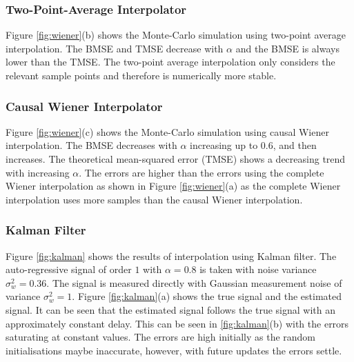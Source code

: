 \documentclass[11pt]{article}
\begin{document}

\subsubsection*{Two-Point-Average Interpolator}
\label{subsubsec:avgimplementation}

Figure \ref{fig:wiener}(b) shows the Monte-Carlo simulation using two-point average interpolation. The BMSE and TMSE decrease with $\alpha$ and the BMSE is always lower than the TMSE. The two-point average interpolation only considers the relevant sample points and therefore is numerically more stable.


\subsubsection*{Causal Wiener Interpolator}
\label{subsubsec:causalimplementation}

Figure \ref{fig:wiener}(c) shows the Monte-Carlo simulation using causal Wiener interpolation. The BMSE decreases with $\alpha$ increasing up to $0.6$, and then increases. The theoretical mean-squared error (TMSE) shows a decreasing trend with increasing $\alpha$. The errors are higher than the errors using the complete Wiener interpolation as shown in Figure \ref{fig:wiener}(a) as the complete Wiener interpolation uses more samples than the causal Wiener interpolation.


\subsubsection*{Kalman Filter}
\label{subsubsec:kalmanimplementation}

Figure \ref{fig:kalman} shows the results of interpolation using Kalman filter. The auto-regressive signal of order $1$ with $\alpha = 0.8$ is taken with noise variance $\sigma_{w}^{2} = 0.36$. The signal is measured directly with Gaussian measurement noise of variance $\sigma_{w}^{2} = 1$. Figure \ref{fig:kalman}(a) shows the true signal and the estimated signal. It can be seen that the estimated signal follows the true signal with an approximately constant delay. This can be seen in \ref{fig:kalman}(b) with the errors saturating at constant values. The errors are high initially as the random initialisations maybe inaccurate, however, with future updates the errors settle.
\end{document}

